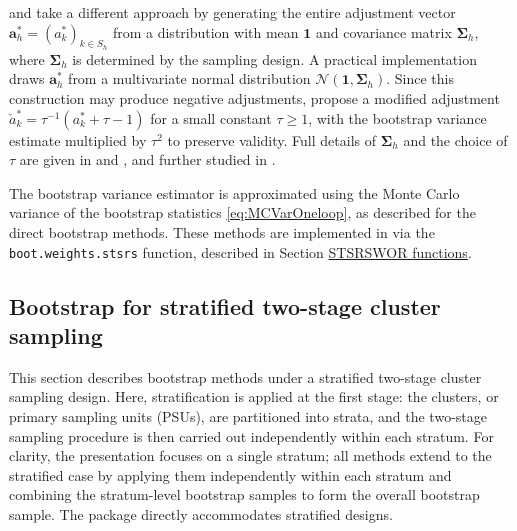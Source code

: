 \citet{Bertail:Combris:1997} and \citet{Beaumont:Patak:2012} take a different approach by generating the entire adjustment vector \(\boldsymbol{a}_h^* = (a_k^*)_{k \in \textrm{$S$}_h}\) from a distribution with mean \(\boldsymbol{1}\) and covariance matrix \(\boldsymbol{\Sigma}_h\), where \(\boldsymbol{\Sigma}_h\) is determined by the sampling design. A practical implementation draws \(\boldsymbol{a}_h^*\) from a multivariate normal distribution \(\mathcal{N}(\boldsymbol{1}, \boldsymbol{\Sigma}_h)\). Since this construction may produce negative adjustments, \citet{Beaumont:Patak:2012} propose a modified adjustment \(\check{a}_k^* = \tau^{-1}(a_k^* + \tau - 1)\) for a small constant \(\tau \geq 1\), with the bootstrap variance estimate multiplied by \(\tau^2\) to preserve validity. Full details of \(\boldsymbol{\Sigma}_h\) and the choice of \(\tau\) are given in \citet{Bertail:Combris:1997} and \citet{Beaumont:Patak:2012}, and further studied in \citet{Mashreghi:Haziza:Leger:2016}.

The bootstrap variance estimator is approximated using the Monte Carlo variance of the bootstrap statistics \eqref{eq:MCVarOneloop}, as described for the direct bootstrap methods.
These methods are implemented in  via the \texttt{boot.weights.stsrs} function, described in Section \hyperref[sec:pkgbootsurvsrs]{STSRSWOR functions}.

\subsection{Bootstrap for stratified two-stage cluster sampling}\label{Boot_TwoStage}

This section describes bootstrap methods under a stratified two-stage cluster sampling design. Here, stratification is applied at the first stage: the clusters, or primary sampling units (PSUs), are partitioned into strata, and the two-stage sampling procedure is then carried out independently within each stratum. For clarity, the presentation focuses on a single stratum; all methods extend to the stratified case by applying them independently within each stratum and combining the stratum-level bootstrap samples to form the overall bootstrap sample. The  package directly accommodates stratified designs.

